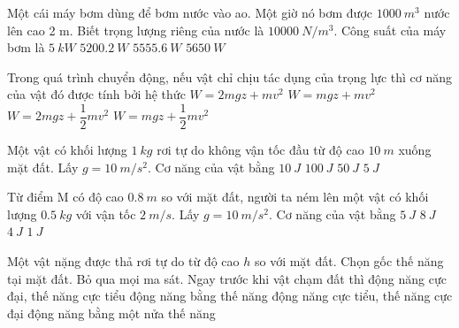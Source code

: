 \begin{ex}
	Một cái máy bơm dùng để bơm nước vào ao. Một giờ nó bơm được $\SI{1000}{m^3}$ nước lên cao 2 m. Biết trọng lượng riêng của nước là $\SI{10000}{N/m^3}$. Công suất của máy bơm là	
	\choice
	{$\SI{5}{kW}$}
	{$\SI{5200.2}{W}$}
	{\True $\SI{5555.6}{W}$}
	{$\SI{5650}{W}$}
\end{ex}
\begin{ex}
	Trong quá trình chuyển động, nếu vật chỉ chịu tác dụng của trọng lực thì cơ năng của vật đó được tính bởi hệ thức	
	\choice
	{$W=2mgz+mv^2$}
	{$W=mgz+mv^2$}
	{$W=2mgz+\dfrac{1}{2}mv^2$}
	{\True $W=mgz+\dfrac{1}{2}mv^2$}
\end{ex}
\begin{ex}
	Một vật có khối lượng $\SI{1}{kg}$ rơi tự do không vận tốc đầu từ độ cao $\SI{10}{m}$ xuống mặt đất. Lấy $g=\SI{10}{m/s^2}$. Cơ năng của vật bằng	
	\choice
	{$\SI{10}{J}$}
	{\True $\SI{100}{J}$}
	{$\SI{50}{J}$}
	{$\SI{5}{J}$}
\end{ex}
\begin{ex}
	Từ điểm M có độ cao $\SI{0.8}{m}$ so với mặt đất, người ta ném lên một vật có khối lượng $\SI{0.5}{kg}$ với vận tốc $\SI{2}{m/s}$. Lấy $g=\SI{10}{m/s^2}$. Cơ năng của vật bằng
	\choice
	{\True $\SI{5}{J}$}
	{$\SI{8}{J}$}
	{$\SI{4}{J}$}
	{$\SI{1}{J}$}
\end{ex}
\begin{ex}
	Một vật nặng được thả rơi tự do từ độ cao $h$ so với mặt đất. Chọn gốc thế năng tại mặt đất. Bỏ qua mọi ma sát. Ngay trước khi vật chạm đất thì
	\choice
	{\True động năng cực đại, thế năng cực tiểu}
	{động năng bằng thế năng}
	{động năng cực tiểu, thế năng cực đại}
	{động năng bằng một nửa thế năng}
\end{ex}
